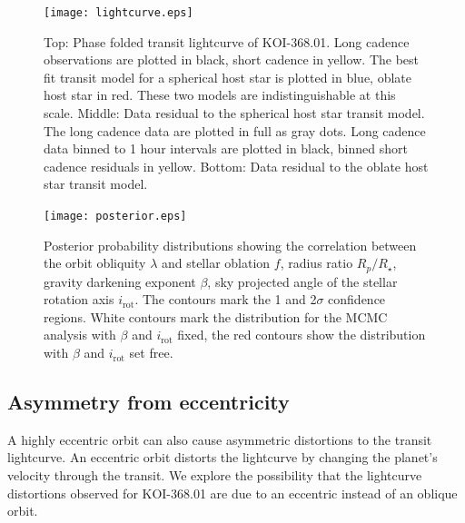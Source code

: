 \documentclass[preprint]{emulateapj}
\begin{document}
\begin{figure}[h!]
  \centering
  \texttt{[image: lightcurve.eps]}
  \caption{Top: Phase folded transit lightcurve of KOI-368.01. Long
    cadence observations are plotted in black, short cadence in
    yellow. The best fit transit model for a spherical host star is
    plotted in blue, oblate host star in red. These two models are
    indistinguishable at this scale. Middle: Data residual to the
    spherical host star transit model. The long cadence data are
    plotted in full as gray dots. Long cadence data binned to 1 hour
    intervals are plotted in black, binned short cadence residuals in yellow. Bottom:
    Data residual to the oblate host star transit model.}
  \label{fig:lightcurve}
\end{figure}

\begin{figure}[h!]
  \centering
  \texttt{[image: posterior.eps]}
  \caption{Posterior probability distributions showing the correlation
  between the orbit obliquity $\lambda$ and stellar oblation $f$,
  radius ratio $R_p/R_\star$, gravity darkening exponent $\beta$, sky
  projected angle of the stellar rotation axis $i_\text{rot}$. The
  contours mark the 1 and 2$\sigma$ confidence regions. White contours
mark the distribution for the MCMC analysis with $\beta$ and
$i_\text{rot}$ fixed, the red contours show the distribution with
$\beta$ and $i_\text{rot}$ set free.}
  \label{fig:posterior}
\end{figure}

\subsection{Asymmetry from eccentricity}
\label{sec:asymm-from-eccentr}

A highly eccentric orbit can also cause asymmetric distortions to the
transit lightcurve. An eccentric orbit distorts the lightcurve by
changing the planet's velocity through the transit. We explore the
possibility that the lightcurve distortions observed for KOI-368.01
are due to an eccentric instead of an oblique orbit.
\end{document}
